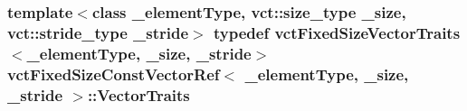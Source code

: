 \hypertarget{classvct_fixed_size_const_vector_ref_a3babba555c9429381db7df666b708aca}{
\subsubsection[{Vector\-Traits}]{\setlength{\rightskip}{0pt plus 5cm}template$<$class \-\_\-element\-Type, vct\-::size\-\_\-type \-\_\-size, vct\-::stride\-\_\-type \-\_\-stride$>$ typedef {\bf vct\-Fixed\-Size\-Vector\-Traits}$<$\-\_\-element\-Type, \-\_\-size, \-\_\-stride$>$ {\bf vct\-Fixed\-Size\-Const\-Vector\-Ref}$<$ \-\_\-element\-Type, \-\_\-size, \-\_\-stride $>$\-::{\bf Vector\-Traits}}}\label{classvct_fixed_size_const_vector_ref_a3babba555c9429381db7df666b708aca}


